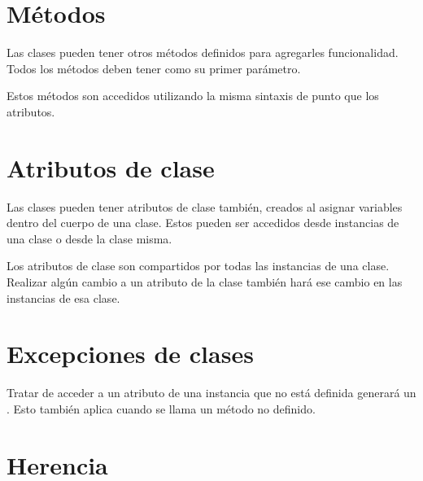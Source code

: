 \section{Métodos}

Las clases pueden tener otros métodos definidos para agregarles funcionalidad.
Todos los métodos deben tener  como su primer parámetro.

Estos métodos son accedidos utilizando la misma sintaxis de punto que los atributos.


\section{Atributos de clase}

Las clases pueden tener atributos de clase también, creados al asignar variables dentro del cuerpo de una clase.
Estos pueden ser accedidos desde instancias de una clase o desde la clase misma.


Los atributos de clase son compartidos por todas las instancias de una clase.
Realizar algún cambio a un atributo de la clase también hará ese cambio en las instancias de esa clase.


\section{Excepciones de clases}

Tratar de acceder a un atributo de una instancia que no está definida generará un .
Esto también aplica cuando se llama un método no definido.



\section{Herencia}


